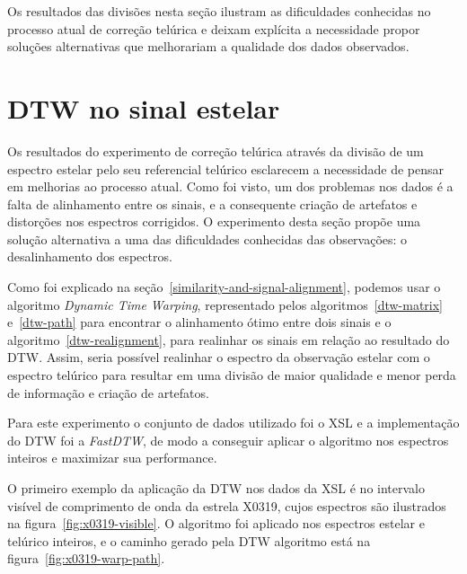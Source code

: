 Os resultados das divisões nesta seção ilustram as dificuldades conhecidas no processo atual de correção telúrica e deixam explícita a necessidade propor soluções alternativas que melhorariam a qualidade dos dados observados.

\section{DTW no sinal estelar}

Os resultados do experimento de correção telúrica através da divisão de um espectro estelar pelo seu referencial telúrico esclarecem a necessidade de pensar em melhorias ao processo atual. Como foi visto, um dos problemas nos dados é a falta de alinhamento entre os sinais, e a consequente criação de artefatos e distorções nos espectros corrigidos. O experimento desta seção propõe uma solução alternativa a uma das dificuldades conhecidas das observações: o desalinhamento dos espectros.


Como foi explicado na seção~\ref{similarity-and-signal-alignment}, podemos usar o algoritmo \textit{Dynamic Time Warping}, representado pelos algoritmos~\ref{dtw-matrix} e~\ref{dtw-path} para encontrar o alinhamento ótimo entre dois sinais e o algoritmo~\ref{dtw-realignment}, para realinhar os sinais em relação ao resultado do DTW. Assim, seria possível realinhar o espectro da observação estelar com o espectro telúrico para resultar em uma divisão de maior qualidade e menor perda de informação e criação de artefatos. 

Para este experimento o conjunto de dados utilizado foi o XSL e a implementação do DTW foi a \textit{FastDTW}, de modo a conseguir aplicar o algoritmo nos espectros inteiros e maximizar sua performance.

O primeiro exemplo da aplicação da DTW nos dados da XSL é no intervalo visível de comprimento de onda da estrela X0319, cujos espectros são ilustrados na figura~\ref{fig:x0319-visible}. O algoritmo foi aplicado nos espectros estelar e telúrico inteiros, e o caminho gerado pela DTW algoritmo está na figura~\ref{fig:x0319-warp-path}.

